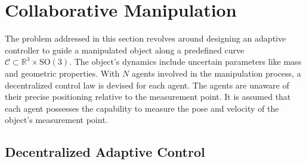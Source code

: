 \section{Collaborative Manipulation}

The problem addressed in this section revolves around designing an adaptive controller to guide a manipulated object along a predefined curve $\mathcal{C} \subset \mathbb{R}^3\times \text{SO}(3)$. The object's dynamics include uncertain parameters like mass and geometric properties. With $N$ agents involved in the manipulation process, a decentralized control law is devised for each agent. The agents are unaware of their precise positioning relative to the measurement point. It is assumed that each agent possesses the capability to measure the pose and velocity of the object's measurement point.
\vspace{-1mm}
\subsection{Decentralized Adaptive Control}
\vspace{-1mm}

